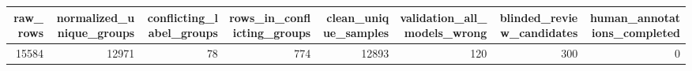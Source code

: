 \begin{tabular}{rrrrrrrr}
\toprule
raw\_rows & normalized\_unique\_groups & conflicting\_label\_groups & rows\_in\_conflicting\_groups & clean\_unique\_samples & validation\_all\_models\_wrong & blinded\_review\_candidates & human\_annotations\_completed \\
\midrule
15584 & 12971 & 78 & 774 & 12893 & 120 & 300 & 0 \\
\bottomrule
\end{tabular}
